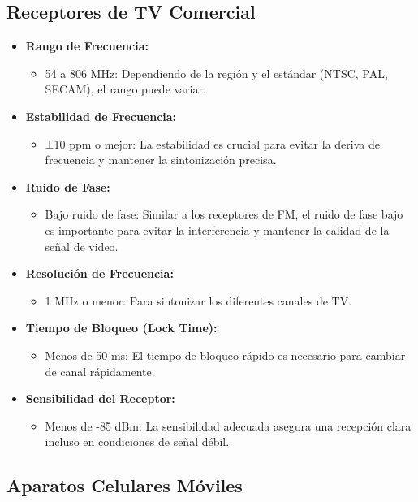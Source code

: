\subsection{Receptores de TV Comercial}

\begin{itemize}
    \item \textbf{Rango de Frecuencia:} 
    \begin{itemize}
        \item 54 a 806 MHz: Dependiendo de la región y el estándar (NTSC, PAL, SECAM), el rango puede variar.
    \end{itemize}
    \item \textbf{Estabilidad de Frecuencia:} 
    \begin{itemize}
        \item ±10 ppm o mejor: La estabilidad es crucial para evitar la deriva de frecuencia y mantener la sintonización precisa.
    \end{itemize}
    \item \textbf{Ruido de Fase:} 
    \begin{itemize}
        \item Bajo ruido de fase: Similar a los receptores de FM, el ruido de fase bajo es importante para evitar la interferencia y mantener la calidad de la señal de video.
    \end{itemize}
    \item \textbf{Resolución de Frecuencia:} 
    \begin{itemize}
        \item 1 MHz o menor: Para sintonizar los diferentes canales de TV.
    \end{itemize}
    \item \textbf{Tiempo de Bloqueo (Lock Time):} 
    \begin{itemize}
        \item Menos de 50 ms: El tiempo de bloqueo rápido es necesario para cambiar de canal rápidamente.
    \end{itemize}
    \item \textbf{Sensibilidad del Receptor:} 
    \begin{itemize}
        \item Menos de -85 dBm: La sensibilidad adecuada asegura una recepción clara incluso en condiciones de señal débil.
    \end{itemize}
\end{itemize}

\subsection{Aparatos Celulares Móviles}

